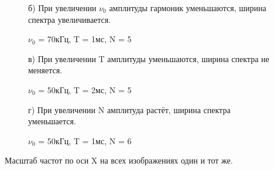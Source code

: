 \documentclass[a4paper,12pt]{article}
\begin{document}
 
 \begin{figure}
 \caption{$\nu_0$ = 70кГц, T = 1мс, N = 5}
 б) При увеличении $\nu_0$ амплитуды гармоник уменьшаются, ширина спектра увеличивается.
 \end{figure}
 


 \begin{figure}
 \caption{$\nu_0$ = 50кГц, T = 2мс, N = 5}
 в) При увеличении T амплитуды уменьшаются, ширина спектра не меняется.
 \end{figure}


 
 \begin{figure}
 \caption{$\nu_0$ = 50кГц, T = 1мс, N = 6}
 г) При увеличении N амплитуда растёт, ширина спектра уменьшается.
 \end{figure}
 


 Масштаб частот по оси X на всех изображениях один и тот же.

\end{document}
